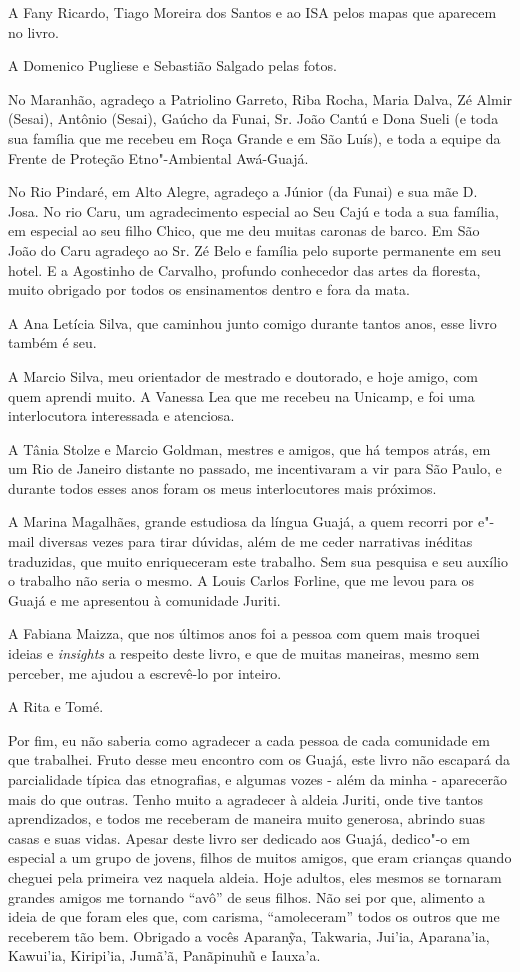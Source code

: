 A Fany Ricardo, Tiago Moreira dos Santos e ao ISA pelos mapas que
aparecem no livro.

A Domenico Pugliese e Sebastião Salgado pelas fotos.

No Maranhão, agradeço a Patriolino Garreto, Riba Rocha, Maria Dalva, Zé
Almir (Sesai), Antônio (Sesai), Gaúcho da Funai, Sr. João Cantú e Dona
Sueli (e toda sua família que me recebeu em Roça Grande e em São Luís),
e toda a equipe da Frente de Proteção Etno"-Ambiental Awá-Guajá.

No Rio Pindaré, em Alto Alegre, agradeço a Júnior (da Funai) e sua mãe
D. Josa. No rio Caru, um agradecimento especial ao Seu Cajú e toda a sua
família, em especial ao seu filho Chico, que me deu muitas caronas de
barco. Em São João do Caru agradeço ao Sr. Zé Belo e família pelo
suporte permanente em seu hotel. E a Agostinho de Carvalho, profundo
conhecedor das artes da floresta, muito obrigado por todos os
ensinamentos dentro e fora da mata.

A Ana Letícia Silva, que caminhou junto comigo durante tantos anos, esse
livro também é seu.

A Marcio Silva, meu orientador de mestrado e doutorado, e hoje amigo,
com quem aprendi muito. A Vanessa Lea que me recebeu na Unicamp, e foi
uma interlocutora interessada e atenciosa.

A Tânia Stolze e Marcio Goldman, mestres e amigos, que há tempos atrás,
em um Rio de Janeiro distante no passado, me incentivaram a vir para São
Paulo, e durante todos esses anos foram os meus interlocutores mais
próximos.

A Marina Magalhães, grande estudiosa da língua Guajá, a quem recorri por
e"-mail diversas vezes para tirar dúvidas, além de me ceder narrativas
inéditas traduzidas, que muito enriqueceram este trabalho. Sem sua
pesquisa e seu auxílio o trabalho não seria o mesmo. A Louis Carlos
Forline, que me levou para os Guajá e me apresentou à comunidade Juriti.

A Fabiana Maizza, que nos últimos anos foi a pessoa com quem mais
troquei ideias e \emph{insights} a respeito deste livro, e que de muitas
maneiras, mesmo sem perceber, me ajudou a escrevê-lo por inteiro.

A Rita e Tomé.

Por fim, eu não saberia como agradecer a cada pessoa de cada comunidade
em que trabalhei. Fruto desse meu encontro com os Guajá, este livro não
escapará da parcialidade típica das etnografias, e algumas vozes - além
da minha - aparecerão mais do que outras. Tenho muito a agradecer à
aldeia Juriti, onde tive tantos aprendizados, e todos me receberam de
maneira muito generosa, abrindo suas casas e suas vidas. Apesar deste
livro ser dedicado aos Guajá, dedico"-o em especial a um grupo de jovens,
filhos de muitos amigos, que eram crianças quando cheguei pela primeira
vez naquela aldeia. Hoje adultos, eles mesmos se tornaram grandes amigos
me tornando ``avô'' de seus filhos. Não sei por que, alimento a ideia de
que foram eles que, com carisma, ``amoleceram'' todos os outros que me
receberem tão bem. Obrigado a vocês Aparanỹa, Takwaria, Jui'ia,
Aparana'ia, Kawui'ia, Kiripi'ia, Jumã'ã, Panãpinuhũ e Iauxa'a.


